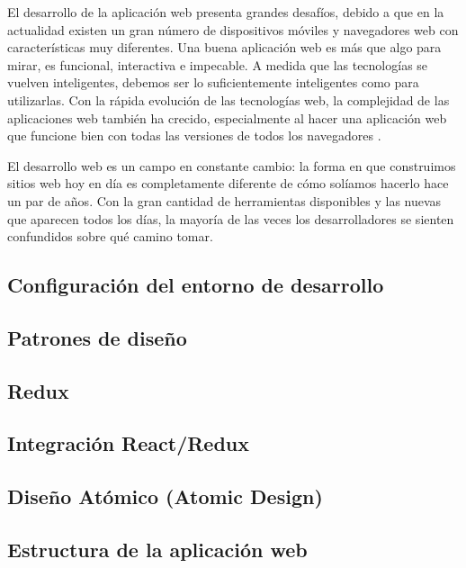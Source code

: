 El desarrollo de la aplicación web presenta grandes desafíos, debido a que en la actualidad existen un gran número de dispositivos móviles y navegadores web con características muy diferentes. Una buena aplicación web es más que algo para mirar, es funcional, interactiva e impecable. A medida que las tecnologías se vuelven inteligentes, debemos ser lo suficientemente inteligentes como para utilizarlas. Con la rápida evolución de las tecnologías web, la complejidad de las aplicaciones web también ha crecido, especialmente al hacer una aplicación web que funcione bien con todas las versiones de todos los navegadores \cite{ochin}.
\vspace{0.8cm}

El desarrollo web es un campo en constante cambio: la forma en que construimos sitios web hoy en día es completamente diferente de cómo solíamos hacerlo hace un par de años. Con la gran cantidad de herramientas disponibles y las nuevas que aparecen todos los días, la mayoría de las veces los desarrolladores se sienten confundidos sobre qué camino tomar.
\vspace{0.8cm}

\subsection{Configuración del entorno de desarrollo}


\subsection{Patrones de diseño}


\subsection{Redux}


\subsection{Integración React/Redux}


\subsection{Diseño Atómico (Atomic Design)}


\subsection{Estructura de la aplicación web}
